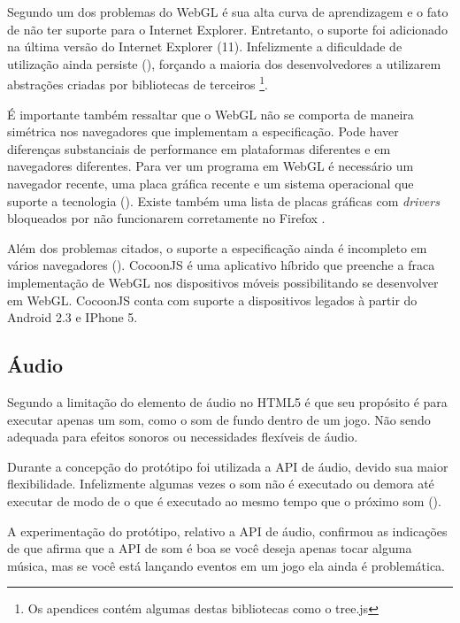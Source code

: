Segundo \citet{html5mostwanted} um dos problemas do WebGL é sua alta
curva de aprendizagem e o fato de não ter suporte para o Internet
Explorer. Entretanto, o suporte foi adicionado na última versão do
Internet Explorer (11). Infelizmente a dificuldade de utilização
ainda persiste (), forçando a maioria dos
desenvolvedores a utilizarem abstrações criadas por bibliotecas de
terceiros \footnote{Os apendices contém algumas destas bibliotecas como
o tree.js}.

É importante também ressaltar que o WebGL não se comporta de
maneira simétrica nos navegadores que implementam a especificação.
Pode haver diferenças substanciais de performance em plataformas
diferentes e em navegadores diferentes. Para ver um programa em WebGL
é necessário um navegador recente, uma placa gráfica recente e um
sistema operacional que suporte a tecnologia \autocite{html5mostwanted}
(). Existe também uma lista de
placas gráficas com \textit{drivers} bloqueados por não funcionarem
corretamente no Firefox \autocite[p.42]{3daps}.

Além dos problemas citados, o suporte a especificação ainda é
incompleto em vários navegadores ().
CocoonJS é uma aplicativo híbrido que preenche a fraca implementação
de WebGL nos dispositivos móveis possibilitando se desenvolver em
WebGL. CocoonJS conta com suporte a dispositivos legados à partir do
Android 2.3 e IPhone 5.

\subsection{Áudio}

Segundo \citet{html5mostwanted} a limitação do elemento de áudio no
HTML5 é que seu propósito é para executar apenas um som, como o som
de fundo dentro de um jogo. Não sendo adequada para efeitos sonoros
ou necessidades flexíveis de áudio.

Durante a concepção do protótipo foi utilizada a API de áudio, devido
sua maior flexibilidade. Infelizmente algumas vezes o som não é
executado ou demora até executar de modo de o que é executado ao mesmo
tempo que o próximo som ().

A experimentação do protótipo, relativo a API de áudio, confirmou
as indicações de \citet{html5mostwanted} que afirma que a API de som
é boa se você deseja apenas tocar alguma música, mas se você está
lançando eventos em um jogo ela ainda é problemática.

